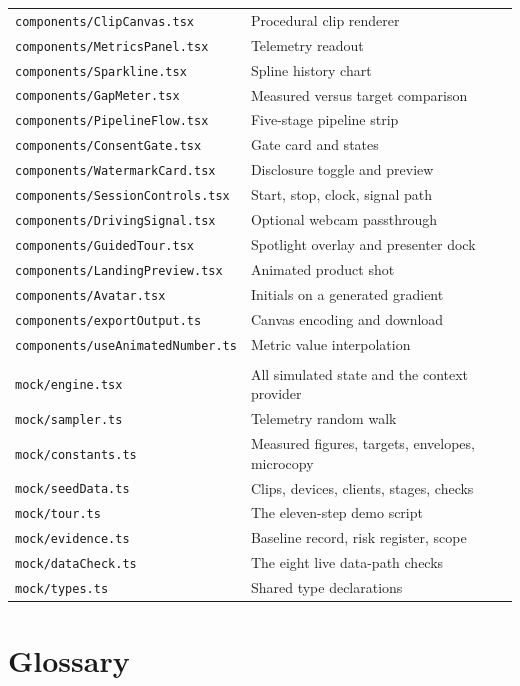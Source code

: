 \documentclass[11pt,a4paper]{report}
\newcommand{\code}[1]{\texttt{\small #1}}
\begin{document}
\begin{longtable}{L{5.6cm} L{9.2cm}}
\code{components/ClipCanvas.tsx} & Procedural clip renderer \\
\code{components/MetricsPanel.tsx} & Telemetry readout \\
\code{components/Sparkline.tsx} & Spline history chart \\
\code{components/GapMeter.tsx} & Measured versus target comparison \\
\code{components/PipelineFlow.tsx} & Five-stage pipeline strip \\
\code{components/ConsentGate.tsx} & Gate card and states \\
\code{components/WatermarkCard.tsx} & Disclosure toggle and preview \\
\code{components/SessionControls.tsx} & Start, stop, clock, signal path \\
\code{components/DrivingSignal.tsx} & Optional webcam passthrough \\
\code{components/GuidedTour.tsx} & Spotlight overlay and presenter dock \\
\code{components/LandingPreview.tsx} & Animated product shot \\
\code{components/Avatar.tsx} & Initials on a generated gradient \\
\code{components/exportOutput.ts} & Canvas encoding and download \\
\code{components/useAnimatedNumber.ts} & Metric value interpolation \\
\addlinespace
{}\\
\code{mock/engine.tsx} & All simulated state and the context provider \\
\code{mock/sampler.ts} & Telemetry random walk \\
\code{mock/constants.ts} & Measured figures, targets, envelopes, microcopy \\
\code{mock/seedData.ts} & Clips, devices, clients, stages, checks \\
\code{mock/tour.ts} & The eleven-step demo script \\
\code{mock/evidence.ts} & Baseline record, risk register, scope \\
\code{mock/dataCheck.ts} & The eight live data-path checks \\
\code{mock/types.ts} & Shared type declarations \\
\bottomrule
\end{longtable}

\chapter{Glossary}
\end{document}
